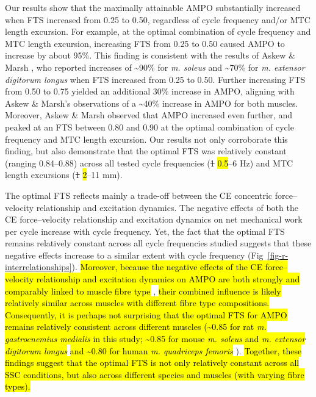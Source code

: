 \documentclass[
  10pt,
  letterpaper,
]{article}
\begin{document}
Our results show that the maximally attainable AMPO substantially
increased when FTS increased from 0.25 to 0.50, regardless of cycle
frequency and/or MTC length excursion. For example, at the optimal
combination of cycle frequency and MTC length excursion, increasing FTS
from 0.25 to 0.50 caused AMPO to increase by about 95\%. This finding is
consistent with the results of {Askew \& Marsh
\citep{askew_effects_1997}}, who reported increases of
\textasciitilde90\% for \emph{m. soleus} and \textasciitilde70\% for
\emph{m. extensor digitorum longus} when FTS increased from 0.25 to
0.50. Further increasing FTS from 0.50 to 0.75 yielded an additional
30\% increase in AMPO, aligning with Askew \& Marsh's observations of a
\textasciitilde40\% increase in AMPO for both muscles. Moreover, {Askew
\& Marsh \citep{askew_effects_1997}} observed that AMPO increased even
further, and peaked at an FTS between 0.80 and 0.90 at the optimal
combination of cycle frequency and MTC length excursion. Our results not
only corroborate this finding, but also demonstrate that the optimal FTS
was relatively constant (ranging 0.84--0.88) across all tested cycle
frequencies (\st{1} \hl{0.5}--6 Hz) and MTC length excursions (\st{1}
\hl{2}--11 mm).

The optimal FTS reflects mainly a trade-off between the CE concentric
force--velocity relationship and excitation dynamics. The negative
effects of both the CE force--velocity relationship and excitation
dynamics on net mechanical work per cycle increase with cycle frequency.
Yet, the fact that the optimal FTS remains relatively constant across
all cycle frequencies studied suggests that these negative effects
increase to a similar extent with cycle frequency
(Fig~\ref{fig-r-interrelationships}). \hl{Moreover, because the negative
effects of the CE force--velocity relationship and excitation dynamics
on AMPO are both strongly and comparably linked to muscle fibre type}
\citep{close_dynamic_1972}, \hl{their combined influence is likely
relatively similar across muscles with different fibre type
compositions. Consequently, it is perhaps not surprising that the
optimal FTS for AMPO remains relatively consistent across different
muscles (\textasciitilde0.85 for rat \emph{m. gastrocnemius medialis} in
this study; \textasciitilde0.85 for mouse \emph{m. soleus} and \emph{m.
extensor digitorum longus}} \citep[see][]{askew_effects_1997} \hl{and
\textasciitilde0.80 for human \emph{m. quadriceps femoris}}
\citep[see][]{reuvers_what_2026}). \hl{Together, these findings suggest
that the optimal FTS is not only relatively constant across all SSC
conditions, but also across different species and muscles (with varying
fibre types).}
\end{document}
